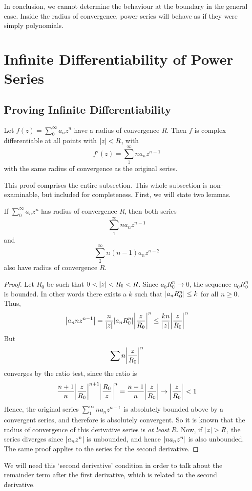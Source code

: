 \documentclass{article}
\begin{document}
\noindent In conclusion, we cannot determine the behaviour at the boundary in the general case. Inside the radius of convergence, power series will behave as if they were simply polynomials.

\section{Infinite Differentiability of Power Series}
\subsection{Proving Infinite Differentiability}
\begin{theorem}
	Let $f(z) = \sum_0^\infty a_n z^n$ have a radius of convergence $R$. Then $f$ is complex differentiable at all points with $\abs{z} < R$, with
	\[ f'(z) = \sum_1^\infty n a_n z^{n-1} \]
	with the same radius of convergence as the original series.
\end{theorem}
\noindent This proof comprises the entire subsection. This whole subsection is non-examinable, but included for completeness. First, we will state two lemmas.
\begin{lemma}
	If $\sum_0^\infty a_n z^n$ has radius of convergence $R$, then both series
	\[ \sum_1^\infty n a_n z^{n-1} \]
	and
	\[ \sum_2^\infty n(n-1)a_n z^{n-2} \]
	also have radius of convergence $R$.
\end{lemma}
\begin{proof}
	Let $R_0$ be such that $0 < \abs{z} < R_0 < R$. Since $a_0 R_0^n \to 0$, the sequence $a_0 R_0^n$ is bounded. In other words there exists a $k$ such that $\abs{a_n R_0^n} \leq k$ for all $n \geq 0$. Thus,
	\[ \abs{a_n n z^{n-1}} = \frac{n}{\abs{z}}\abs{a_n R_0^n} \abs{\frac{z}{R_0}}^n \leq \frac{kn}{\abs{z}}\abs{\frac{z}{R_0}}^n \]
	But
	\[ \sum n\abs{\frac{z}{R_0}}^n \]
	converges by the ratio test, since the ratio is
	\[ \frac{n+1}{n}\abs{\frac{z}{R_0}}^{n+1} \abs{\frac{R_0}{z}}^n = \frac{n+1}{n}\abs{\frac{z}{R_0}} \to \abs{\frac{z}{R_0}} < 1 \]
	Hence, the original series $\sum_1^\infty n a_n z^{n-1}$ is absolutely bounded above by a convergent series, and therefore is absolutely convergent. So it is known that the radius of convergence of this derivative series is \textit{at least} $R$. Now, if $\abs{z} > R$, the series diverges since $\abs{a_n z^n}$ is unbounded, and hence $\abs{n a_n z^n}$ is also unbounded. The same proof applies to the series for the second derivative.
\end{proof}
\noindent We will need this `second derivative' condition in order to talk about the remainder term after the first derivative, which is related to the second derivative.
\end{document}
